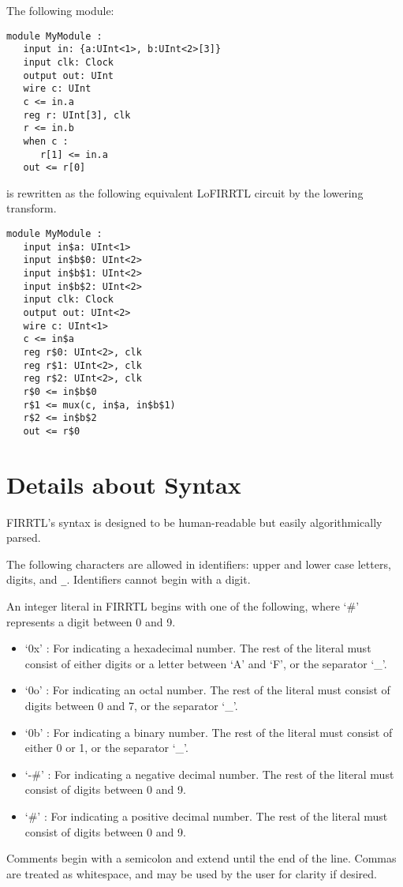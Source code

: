 \documentclass[12pt]{article}
\begin{document}
The following module:
\begin{verbatim}
module MyModule :
   input in: {a:UInt<1>, b:UInt<2>[3]}
   input clk: Clock
   output out: UInt
   wire c: UInt
   c <= in.a
   reg r: UInt[3], clk
   r <= in.b
   when c :
      r[1] <= in.a
   out <= r[0]   
\end{verbatim}
is rewritten as the following equivalent LoFIRRTL circuit by the lowering transform.
\begin{verbatim}
module MyModule :
   input in$a: UInt<1>
   input in$b$0: UInt<2>
   input in$b$1: UInt<2>
   input in$b$2: UInt<2>
   input clk: Clock
   output out: UInt<2>
   wire c: UInt<1>
   c <= in$a
   reg r$0: UInt<2>, clk
   reg r$1: UInt<2>, clk
   reg r$2: UInt<2>, clk 
   r$0 <= in$b$0
   r$1 <= mux(c, in$a, in$b$1)
   r$2 <= in$b$2
   out <= r$0
\end{verbatim}

\section{Details about Syntax}

FIRRTL's syntax is designed to be human-readable but easily algorithmically parsed.

The following characters are allowed in identifiers: upper and lower case letters, digits, and \verb|_|. Identifiers cannot begin with a digit. 

An integer literal in FIRRTL begins with one of the following, where `\#' represents a digit between 0 and 9. 
\begin{itemize}
\item `0x' : For indicating a hexadecimal number. The rest of the literal must consist of either digits or a letter between `A' and `F', or the separator `\_'. 
\item `0o' : For indicating an octal number. The rest of the literal must consist of digits between 0 and 7, or the separator `\_'. 
\item `0b' : For indicating a binary number. The rest of the literal must consist of either 0 or 1, or the separator `\_'.
\item `-\#' : For indicating a negative decimal number. The rest of the literal must consist of digits between 0 and 9.
\item `\#' : For indicating a positive decimal number. The rest of the literal must consist of digits between 0 and 9.
\end{itemize}

Comments begin with a semicolon and extend until the end of the line. Commas are treated as whitespace, and may be used by the user for clarity if desired.
\end{document}

